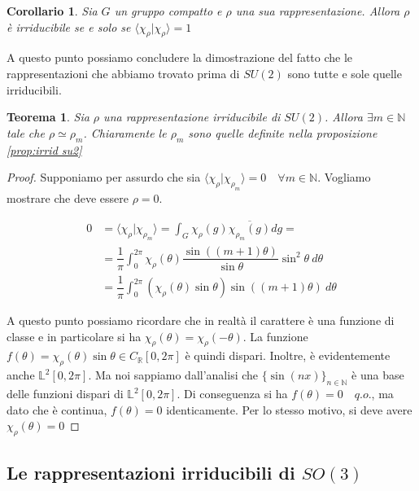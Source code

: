 \documentclass[11pt]{article}
\theoremstyle{plain}
\newtheorem{thm}{Teorema}[section]
\newtheorem*{cor}{Corollario}
\theoremstyle{definition}
\theoremstyle{remark}
\newcommand{\R}{\mathbb{R}}
\newcommand{\N}{\mathbb{N}}
\newcommand{\dint}{\displaystyle\int}
\DeclareMathOperator{\iso}{\simeq}
\begin{document}
 \begin{cor}
   Sia $G$ un gruppo compatto e $\rho$ una sua rappresentazione. Allora $\rho$ è irriducibile se e solo se $\langle \chi_\rho | \chi_\rho \rangle = 1$
 \end{cor}


 A questo punto possiamo concludere la dimostrazione del fatto che le rappresentazioni che abbiamo trovato prima di $SU(2)$ sono tutte e sole quelle irriducibili.


 \begin{thm}
   Sia $\rho$ una rappresentazione irriducibile di $SU(2)$. Allora $\exists m \in \N$ tale che $\rho \iso \rho_m$. Chiaramente le $\rho_m$ sono quelle definite nella proposizione \ref{prop:irrid su2}
 \end{thm}

 \begin{proof}
   Supponiamo per assurdo che sia $\langle \chi_\rho | \chi_{\rho_m} \rangle = 0 \quad \forall m \in \N$. Vogliamo mostrare che deve essere $\rho = 0$.


   \begin{align*}
     0 &= \langle \chi_\rho | \chi_{\rho_m} \rangle = \dint_G \chi_\rho(g) \overline{\chi_{\rho_m} (g)} dg = \\
     &= \dfrac{1}{\pi} \dint_0^{2\pi} \chi_\rho(\theta) \dfrac{\sin((m+1)\theta)}{\sin\theta} \sin^2\theta  \ d\theta \\
     &= \dfrac{1}{\pi} \dint_{0}^{2\pi} \left(\chi_\rho (\theta) \sin\theta \right) \sin(  (m+1) \theta) \ d\theta
   \end{align*}

   A questo punto possiamo ricordare che in realtà il carattere è una funzione di classe e in particolare si ha $\chi_\rho(\theta) = \chi_\rho(-\theta)$. La funzione $f(\theta) = \chi_\rho(\theta) \sin\theta \in C_\R[0,2\pi]$ è quindi dispari. Inoltre, è evidentemente anche $\mathbb{L}^2 [0,2\pi]$. Ma noi sappiamo dall'analisi che $\{\sin(nx)\}_{n\in \N}$ è una base delle funzioni dispari di $\mathbb{L}^2[0,2\pi]$. Di conseguenza si ha $f(\theta) = 0 \quad q.o.$, ma dato che è continua, $f(\theta) = 0$ identicamente. Per lo stesso motivo, si deve avere $\chi_\rho(\theta) = 0$

 \end{proof}


 \newpage
 \subsection{Le rappresentazioni irriducibili di $SO(3)$}
\end{document}
